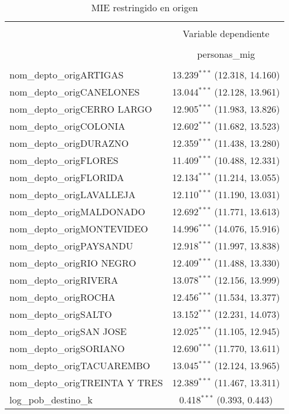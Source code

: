 
\begin{table}[H] \centering 
  \caption{MIE restringido en origen} 
  \label{} 
\begin{tabular}{@{\extracolsep{5pt}}lc} 
\\[-1.8ex]\hline 
\hline \\[-1.8ex] 
 & \multicolumn{1}{c}{Variable dependiente} \\ 
\cline{2-2} 
\\[-1.8ex] & personas\_mig \\ 
\hline \\[-1.8ex] 
 nom\_depto\_origARTIGAS & 13.239$^{***}$ (12.318, 14.160) \\ 
  nom\_depto\_origCANELONES & 13.044$^{***}$ (12.128, 13.961) \\ 
  nom\_depto\_origCERRO LARGO & 12.905$^{***}$ (11.983, 13.826) \\ 
  nom\_depto\_origCOLONIA & 12.602$^{***}$ (11.682, 13.523) \\ 
  nom\_depto\_origDURAZNO & 12.359$^{***}$ (11.438, 13.280) \\ 
  nom\_depto\_origFLORES & 11.409$^{***}$ (10.488, 12.331) \\ 
  nom\_depto\_origFLORIDA & 12.134$^{***}$ (11.214, 13.055) \\ 
  nom\_depto\_origLAVALLEJA & 12.110$^{***}$ (11.190, 13.031) \\ 
  nom\_depto\_origMALDONADO & 12.692$^{***}$ (11.771, 13.613) \\ 
  nom\_depto\_origMONTEVIDEO & 14.996$^{***}$ (14.076, 15.916) \\ 
  nom\_depto\_origPAYSANDU & 12.918$^{***}$ (11.997, 13.838) \\ 
  nom\_depto\_origRIO NEGRO & 12.409$^{***}$ (11.488, 13.330) \\ 
  nom\_depto\_origRIVERA & 13.078$^{***}$ (12.156, 13.999) \\ 
  nom\_depto\_origROCHA & 12.456$^{***}$ (11.534, 13.377) \\ 
  nom\_depto\_origSALTO & 13.152$^{***}$ (12.231, 14.073) \\ 
  nom\_depto\_origSAN JOSE & 12.025$^{***}$ (11.105, 12.945) \\ 
  nom\_depto\_origSORIANO & 12.690$^{***}$ (11.770, 13.611) \\ 
  nom\_depto\_origTACUAREMBO & 13.045$^{***}$ (12.124, 13.965) \\ 
  nom\_depto\_origTREINTA Y TRES & 12.389$^{***}$ (11.467, 13.311) \\ 
  log\_pob\_destino\_k & 0.418$^{***}$ (0.393, 0.443) \\ 

\end{tabular}
\end{table}
